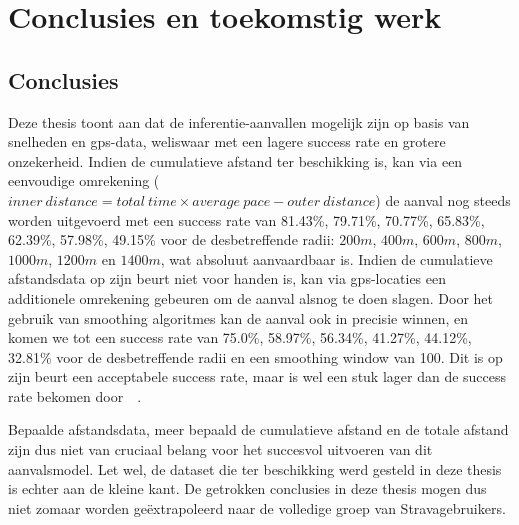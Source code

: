 \chapter{Conclusies en toekomstig werk}
\section{Conclusies}
Deze thesis toont aan dat de inferentie-aanvallen mogelijk zijn op basis van
snelheden en \ac{gps}-data, weliswaar met een lagere success rate en grotere
onzekerheid. Indien de cumulatieve afstand ter beschikking is, kan via een
eenvoudige omrekening ($inner\ distance = total\ time \times average\ pace -
      outer\ distance$) de aanval nog steeds worden uitgevoerd met een success rate
van 81.43\%, 79.71\%, 70.77\%, 65.83\%, 62.39\%, 57.98\%, 49.15\% voor de
desbetreffende radii: $200m$, $400m$, $600m$, $800m$, $1000m$, $1200m $ en
$1400m$, wat absoluut aanvaardbaar is. Indien de cumulatieve afstandsdata op
zijn beurt niet voor handen is, kan via \ac{gps}-locaties een additionele
omrekening gebeuren om de aanval alsnog te doen slagen. Door het gebruik van
smoothing algoritmes kan de aanval ook in precisie winnen, en komen we tot een
success rate van 75.0\%, 58.97\%, 56.34\%, 41.27\%, 44.12\%, 32.81\% voor de
desbetreffende radii en een smoothing window van 100. Dit is op zijn beurt een
acceptabele success rate, maar is wel een stuk lager dan de success rate
bekomen door~\citeauthor{Dhondt}~\cite{Dhondt}.

Bepaalde afstandsdata, meer bepaald de cumulatieve afstand en de totale afstand
zijn dus niet van cruciaal belang voor het succesvol uitvoeren van dit
aanvalsmodel. Let wel, de dataset die ter beschikking werd gesteld in deze
thesis is echter aan de kleine kant. De getrokken conclusies in deze thesis
mogen dus niet zomaar worden geëxtrapoleerd naar de volledige groep van
Stravagebruikers.

